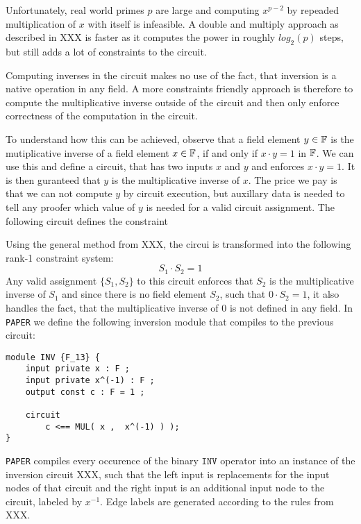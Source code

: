 Unfortunately, real world primes $p$ are large and computing $x^{p-2}$ by repeaded multiplication of $x$ with itself is infeasible. A double and multiply approach as described in XXX is faster as it computes the power in roughly $log_2(p)$ steps, but still adds a lot of constraints to the circuit. 

Computing inverses in the circuit makes no use of the fact, that inversion is a native operation in any field. A more constraints friendly approach is therefore to compute the multiplicative inverse outside of the circuit and then only enforce correctness of the computation in the circuit. 

To understand how this can be achieved, observe that a field element $y\in \mathbb{F}$ is the mutiplicative inverse of a field element $x\in \mathbb{F}$, if and only if $x\cdot y =1$ in $\mathbb{F}$. We can use this and define a circuit, that has two inputs $x$ and $y$ and enforces $x\cdot y =1$. It is then guranteed that $y$ is the multiplicative inverse of $x$. The price we pay is that we can not compute $y$ by circuit execution, but auxillary data is needed to tell any proofer which value of $y$ is needed for a valid circuit assignment.  The following circuit defines the constraint
\begin{center}
\end{center}
Using the general method from XXX, the circui is transformed into the following rank-1 constraint system:
\begin{equation}
S_1 \cdot S_2 = 1
\end{equation}
Any valid assignment $\{S_1,S_2\}$ to this circuit enforces that $S_2$ is the multiplicative inverse of $S_1$ and since there is no field element $S_2$, such that $0\cdot S_2=1$, it also handles the fact, that the multiplicative inverse of $0$ is not defined in any field. In \texttt{PAPER} we define the following inversion module that compiles to the previous circuit:
\begin{lstlisting}
module INV {F_13} {
	input private x : F ; 
	input private x^(-1) : F ; 
	output const c : F = 1 ;

	circuit
		c <== MUL( x ,  x^(-1) ) );
}
\end{lstlisting}
\texttt{PAPER} compiles every occurence of the binary $\mathtt{INV}$ operator into an instance of the inversion circuit XXX, such that the left input is replacements for the input nodes of that circuit and the right input is an additional input node to the circuit, labeled by $x^{-1}$. Edge labels are generated according to the rules from XXX.
